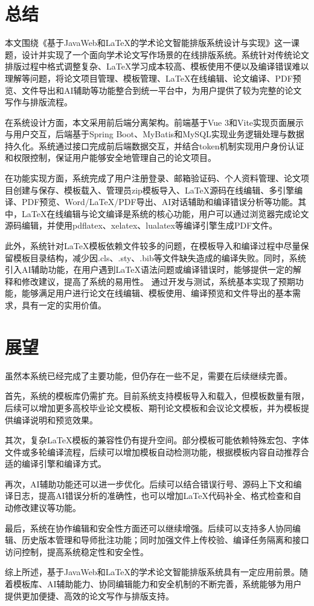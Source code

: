 \documentclass{xduugthesis}
\begin{document}
\section{总结}
本文围绕《基于JavaWeb和LaTeX的学术论文智能排版系统设计与实现》这一课题，设计并实现了一个面向学术论文写作场景的在线排版系统。系统针对传统论文排版过程中格式调整复杂、LaTeX学习成本较高、模板使用不便以及编译错误难以理解等问题，将论文项目管理、模板管理、LaTeX在线编辑、论文编译、PDF预览、文件导出和AI辅助等功能整合到统一平台中，为用户提供了较为完整的论文写作与排版流程。

在系统设计方面，本文采用前后端分离架构。前端基于Vue 3和Vite实现页面展示与用户交互，后端基于Spring Boot、MyBatis和MySQL实现业务逻辑处理与数据持久化。系统通过接口完成前后端数据交互，并结合token机制实现用户身份认证和权限控制，保证用户能够安全地管理自己的论文项目。

在功能实现方面，系统完成了用户注册登录、邮箱验证码、个人资料管理、论文项目创建与保存、模板载入、管理员zip模板导入、LaTeX源码在线编辑、多引擎编译、PDF预览、Word/LaTeX/PDF导出、AI对话辅助和编译错误分析等功能。其中，LaTeX在线编辑与论文编译是系统的核心功能，用户可以通过浏览器完成论文源码编辑，并使用pdflatex、xelatex、lualatex等编译引擎生成PDF文件。

此外，系统针对LaTeX模板依赖文件较多的问题，在模板导入和编译过程中尽量保留模板目录结构，减少因.cls、.sty、.bib等文件缺失造成的编译失败。同时，系统引入AI辅助功能，在用户遇到LaTeX语法问题或编译错误时，能够提供一定的解释和修改建议，提高了系统的易用性。
通过开发与测试，系统基本实现了预期功能，能够满足用户进行论文在线编辑、模板使用、编译预览和文件导出的基本需求，具有一定的实用价值。

\section{展望}
虽然本系统已经完成了主要功能，但仍存在一些不足，需要在后续继续完善。

首先，系统的模板库仍需扩充。目前系统支持模板导入和载入，但模板数量有限，后续可以增加更多高校毕业论文模板、期刊论文模板和会议论文模板，并为模板提供编译说明和预览效果。

其次，复杂LaTeX模板的兼容性仍有提升空间。部分模板可能依赖特殊宏包、字体文件或多轮编译流程，后续可以增加模板自动检测功能，根据模板内容自动推荐合适的编译引擎和编译方式。

再次，AI辅助功能还可以进一步优化。后续可以结合错误行号、源码上下文和编译日志，提高AI错误分析的准确性，也可以增加LaTeX代码补全、格式检查和自动修改建议等功能。

最后，系统在协作编辑和安全性方面还可以继续增强。后续可以支持多人协同编辑、历史版本管理和导师批注功能；同时加强文件上传校验、编译任务隔离和接口访问控制，提高系统稳定性和安全性。

综上所述，基于JavaWeb和LaTeX的学术论文智能排版系统具有一定应用前景。随着模板库、AI辅助能力、协同编辑能力和安全机制的不断完善，系统能够为用户提供更加便捷、高效的论文写作与排版支持。
\end{document}
